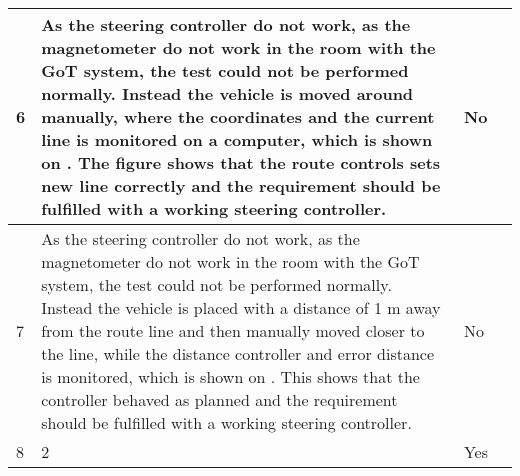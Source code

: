 \begin{table}[H]
\begin{tabular}{|p{1cm}|p{10cm}|p{2cm}|p{3cm}|}
           6    &   As the steering controller do not work, as the magnetometer do not work in the room with the GoT system, the test could not be performed normally. Instead the vehicle is moved around manually, where the coordinates and the current line is monitored on a computer, which is shown on \figref{}. The figure shows that the route controls sets new line correctly and the requirement should be fulfilled with a working steering controller.  &    No                \\
\hline%
           7    &   As the steering controller do not work, as the magnetometer do not work in the room with the GoT system, the test could not be performed normally. Instead the vehicle is placed with a distance of 1 m away from the route line and then manually moved closer to the line, while the distance controller and error distance is monitored, which is shown on \figref{}. This shows that the controller behaved as planned and the requirement should be fulfilled with a working steering controller.   &   No            \\ 
\hline%
           8    &   2  &    Yes              \\
\hline%
\end{tabular}
\label{tab:AcceptTestTestResults}
\end{table}

